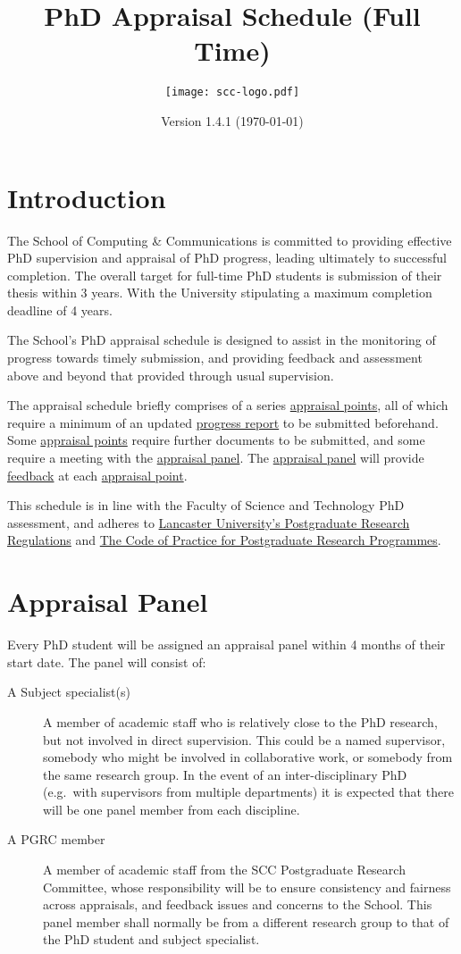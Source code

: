 \documentclass[12pt,a4paper]{article}
\title{PhD Appraisal Schedule (Full Time)}
\author{\texttt{[image: scc-logo.pdf]}}
\date{Version 1.4.1 (\today)}
\begin{document}
\maketitle

\section{Introduction}
The School of Computing \& Communications is committed to providing effective PhD supervision and appraisal of PhD progress, leading ultimately to successful completion. The overall target for full-time PhD students is submission of their thesis within 3 years. With the University stipulating a maximum completion deadline of 4 years.

The School's PhD appraisal schedule is designed to assist in the monitoring of progress towards timely submission, and providing feedback and assessment above and beyond that provided through usual supervision.

The appraisal schedule briefly comprises of a series \hyperref[sec:points]{appraisal points}, all of which require a minimum of an updated \hyperref[sec:report]{progress report} to be submitted beforehand. Some \hyperref[sec:points]{appraisal points} require further documents to be submitted, and some require a meeting with the \hyperref[sec:panel]{appraisal panel}. The \hyperref[sec:panel]{appraisal panel} will provide \hyperref[sec:feedback]{feedback} at each \hyperref[sec:points]{appraisal point}.

This schedule is in line with the Faculty of Science and Technology PhD assessment, and adheres to
\href{https://gap.lancs.ac.uk/ASQ/QAE/MARP/Documents/PGR-Regs.pdf}{Lancaster University's Postgraduate Research Regulations} and 
\href{https://gap.lancs.ac.uk/ASQ/Policies/Documents/Postgraduate-Research-Code-of-Practice.pdf}{The Code of Practice for Postgraduate Research Programmes}.

\section{Appraisal Panel} \label{sec:panel}
Every PhD student will be assigned an appraisal panel within 4 months of their start date. The panel will consist of:
\begin{description}
	\item[A Subject specialist(s)] A member of academic staff who is relatively close to the PhD research, but not involved in direct supervision. This could be a named supervisor, somebody who might be involved in collaborative work, or somebody from the same research group. In the event of an inter-disciplinary PhD (e.g.\ with supervisors from multiple departments) it is expected that there will be one panel member from each discipline.
	\item[A PGRC member] A member of academic staff from the SCC Postgraduate Research Committee, whose responsibility will be to ensure consistency and fairness across appraisals, and feedback issues and concerns to the School. This panel member shall normally be from a different research group to that of the PhD student and subject specialist.
\end{description}
\end{document}

